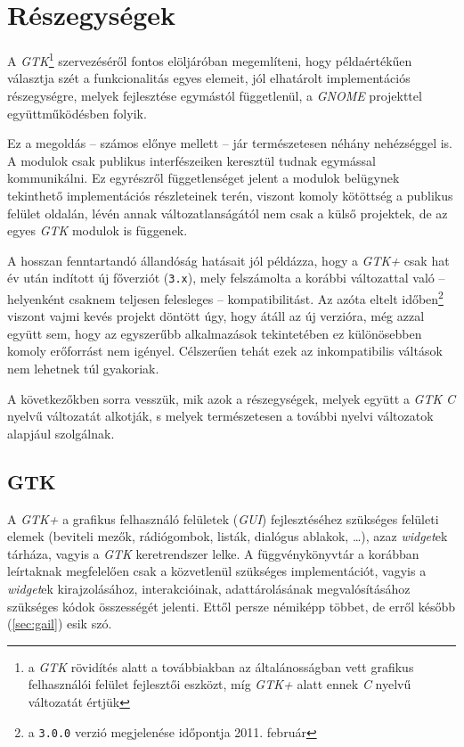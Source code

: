 \section{Részegységek}

A \textit{GTK}\footnote{a \textit{GTK} rövidítés alatt a továbbiakban az általánosságban vett grafikus felhasználói felület fejlesztői eszközt, míg \textit{GTK+} alatt ennek \textit{C} nyelvű változatát értjük} szervezéséről fontos elöljáróban megemlíteni, hogy példaértékűen választja szét a funkcionalitás egyes elemeit, jól elhatárolt implementációs részegységre, melyek fejlesztése egymástól függetlenül, a \textit{GNOME} projekttel együttműködésben folyik.

Ez a megoldás -- számos előnye mellett -- jár természetesen néhány nehézséggel is. A modulok csak publikus interfészeiken keresztül tudnak egymással kommunikálni. Ez egyrészről függetlenséget jelent a modulok belügynek tekinthető implementációs részleteinek terén, viszont komoly kötöttség a publikus felület oldalán, lévén annak változatlanságától nem csak a külső projektek, de az egyes \textit{GTK} modulok is függenek.

A hosszan fenntartandó állandóság hatásait jól példázza, hogy a \textit{GTK+} csak hat év után indított új főverziót (\texttt{3.x}), mely felszámolta a korábbi változattal való -- helyenként csaknem teljesen felesleges -- kompatibilitást. Az azóta eltelt időben\footnote{a \texttt{3.0.0} verzió megjelenése időpontja 2011. február} viszont vajmi kevés projekt döntött úgy, hogy átáll az új verzióra, még azzal együtt sem, hogy az egyszerűbb alkalmazások tekintetében ez különösebben komoly erőforrást nem igényel. Célszerűen tehát ezek az inkompatibilis váltások nem lehetnek túl gyakoriak.

A következőkben sorra vesszük, mik azok a részegységek, melyek együtt a \textit{GTK} \textit{C} nyelvű változatát alkotják, s melyek természetesen a további nyelvi változatok alapjául szolgálnak.

\subsection{GTK}

A \textit{GTK+} a grafikus felhasználó felületek (\textit{GUI}) fejlesztéséhez szükséges felületi elemek (beviteli mezők, rádiógombok, listák, dialógus ablakok, \dots), azaz \textit{widget}ek tárháza, vagyis a \textit{GTK} keretrendszer lelke. A függvénykönyvtár a korábban leírtaknak megfelelően csak a közvetlenül szükséges implementációt, vagyis a \textit{widget}ek kirajzolásához, interakcióinak, adattárolásának megvalósításához szükséges kódok összességét jelenti. Ettől persze némiképp többet, de erről később (\ref{sec:gail}) esik szó.

